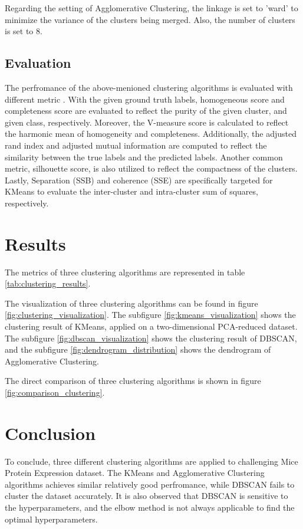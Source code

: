 \documentclass[12pt,a4paper]{article}
\begin{document}
Regarding the setting of Agglomerative Clustering, the linkage is set to 'ward' to minimize the variance of the clusters being merged. Also, the number of clusters is set to 8.

\subsection{Evaluation}\label{subsec:evaluation}
The perfromance of the above-menioned clustering algorithms is evaluated with different metric \cite{scikit-learn_clustering}. 
With the given ground truth labels, homogeneous score and completeness score are evaluated to reflect the purity of the given cluster, and given class, respectively.
Moreover, the V-measure score is calculated to reflect the harmonic mean of homogeneity and completeness. 
Additionally, the adjusted rand index and adjusted mutual information are computed to reflect the similarity between the true labels and the predicted labels. 
Another common metric, silhouette score, is also utilized to reflect the compactness of the clusters. 
Lastly, Separation (SSB) and coherence (SSE) are specifically targeted for KMeans to evaluate the inter-cluster and intra-cluster sum of squares, respectively.



\section{Results}\label{sec:results}
The metrics of three clustering algorithms are represented in table \ref{tab:clustering_results}.

The visualization of three clustering algorithms can be found in figure \ref{fig:clustering_visualization}. The subfigure \ref{fig:kmeans_visualization} shows the clustering result of KMeans, applied on a two-dimensional PCA-reduced dataset. 
The subfigure \ref{fig:dbscan_visualization} shows the clustering result of DBSCAN, and the subfigure \ref{fig:dendrogram_distribution} shows the dendrogram of Agglomerative Clustering.

The direct comparison of three clustering algorithms is shown in figure \ref{fig:comparison_clustering}.

\section{Conclusion}\label{sec:conclusion}
To conclude, three different clustering algorithms are applied to challenging Mice Protein Expression dataset. 
The KMeans and Agglomerative Clustering algorithms achieves similar relatively good perfromance, while DBSCAN fails to cluster the dataset accurately. 
It is also observed that DBSCAN is sensitive to the hyperparameters, and the elbow method is not always applicable to find the optimal hyperparameters.
\end{document}
